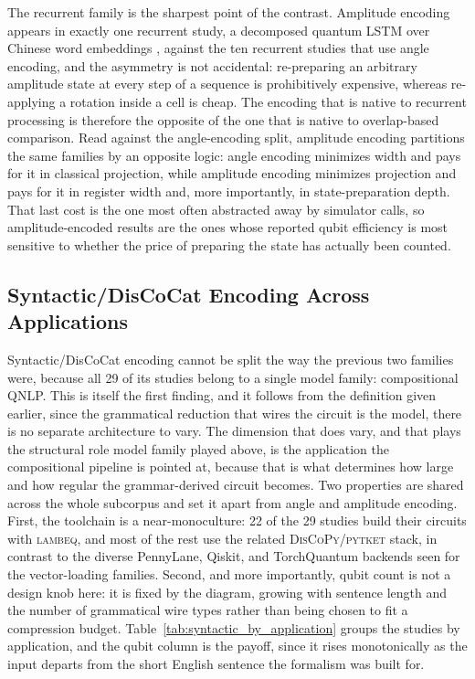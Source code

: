 \documentclass{ieeeaccess}
\begin{document}
The recurrent family is the sharpest point of the contrast. Amplitude encoding appears in exactly one recurrent study, a decomposed quantum LSTM over Chinese word embeddings \cite{hou_realization_2022}, against the ten recurrent studies that use angle encoding, and the asymmetry is not accidental: re-preparing an arbitrary amplitude state at every step of a sequence is prohibitively expensive, whereas re-applying a rotation inside a cell is cheap. The encoding that is native to recurrent processing is therefore the opposite of the one that is native to overlap-based comparison. Read against the angle-encoding split, amplitude encoding partitions the same families by an opposite logic: angle encoding minimizes width and pays for it in classical projection, while amplitude encoding minimizes projection and pays for it in register width and, more importantly, in state-preparation depth. That last cost is the one most often abstracted away by simulator calls, so amplitude-encoded results are the ones whose reported qubit efficiency is most sensitive to whether the price of preparing the state has actually been counted.

\subsection{Syntactic/DisCoCat Encoding Across Applications}
\label{subsec:syntactic_across_applications}

Syntactic/DisCoCat encoding cannot be split the way the previous two families were, because all 29 of its studies belong to a single model family: compositional QNLP. This is itself the first finding, and it follows from the definition given earlier, since the grammatical reduction that wires the circuit is the model, there is no separate architecture to vary. The dimension that does vary, and that plays the structural role model family played above, is the application the compositional pipeline is pointed at, because that is what determines how large and how regular the grammar-derived circuit becomes. Two properties are shared across the whole subcorpus and set it apart from angle and amplitude encoding. First, the toolchain is a near-monoculture: 22 of the 29 studies build their circuits with \textsc{lambeq}, and most of the rest use the related \textsc{DisCoPy}/\textsc{pytket} stack, in contrast to the diverse PennyLane, Qiskit, and TorchQuantum backends seen for the vector-loading families. Second, and more importantly, qubit count is not a design knob here: it is fixed by the diagram, growing with sentence length and the number of grammatical wire types rather than being chosen to fit a compression budget. Table~\ref{tab:syntactic_by_application} groups the studies by application, and the qubit column is the payoff, since it rises monotonically as the input departs from the short English sentence the formalism was built for.
\end{document}
